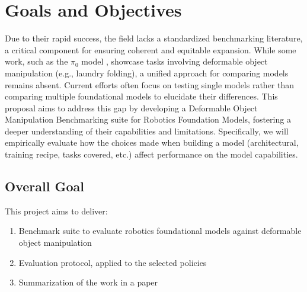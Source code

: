 \section{Goals and Objectives}
Due to their rapid success, the field lacks a standardized benchmarking literature, a critical component for ensuring coherent and equitable expansion. While some work, such as the $\pi_0$ model \cite{pi_zero}, showcase tasks involving deformable object manipulation (e.g., laundry folding), a unified approach for comparing models remains absent. Current efforts often focus on testing single models rather than comparing multiple foundational models to elucidate their differences. This proposal aims to address this gap by developing a Deformable Object Manipulation Benchmarking suite for Robotics Foundation Models, fostering a deeper understanding of their capabilities and limitations. Specifically, we will empirically evaluate how the choices made when building a model (architectural, training recipe, tasks covered, etc.) affect performance on the model capabilities.


\subsection{Overall Goal}

This project aims to deliver:

    \begin{enumerate}
        \item Benchmark suite to evaluate robotics foundational models against deformable object manipulation
        \item Evaluation protocol, applied to the selected policies 
        \item Summarization of the work in a paper
    \end{enumerate}


